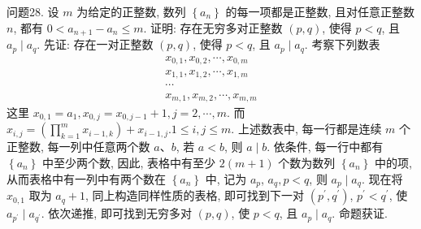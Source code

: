 问题28. 设 $m$ 为给定的正整数, 数列 $\left\{a_n\right\}$ 的每一项都是正整数, 且对任意正整数 $n$, 都有 $0<a_{n+1}-a_n \leqslant m$.
证明: 存在无穷多对正整数 $(p, q)$, 使得 $p<q$, 且 $a_p \mid a_q$.
先证: 存在一对正整数 $(p, q)$, 使得 $p<q$, 且 $a_p \mid a_q$. 考察下列数表
$$
\begin{gathered}
x_{0,1}, x_{0,2}, \cdots, x_{0, m} \\
x_{1,1}, x_{1,2}, \cdots, x_{1, m} \\
\cdots \\
x_{m, 1}, x_{m, 2}, \cdots, x_{m, m}
\end{gathered}
$$
这里 $x_{0,1}=a_1, x_{0, j}=x_{0, j-1}+1, j=2, \cdots, m$. 而 $x_{i, j}=\left(\prod_{k=1}^m x_{i-1, k}\right)+ x_{i-1, j} .1 \leqslant i, j \leqslant m$.
上述数表中, 每一行都是连续 $m$ 个正整数, 每一列中任意两个数 $a 、 b$, 若 $a<b$, 则 $a \mid b$.
依条件, 每一行中都有 $\left\{a_n\right\}$ 中至少两个数, 因此, 表格中有至少 $2(m+1)$ 个数为数列 $\left\{a_n\right\}$ 中的项, 从而表格中有一列中有两个数在 $\left\{a_n\right\}$ 中, 记为 $a_p$, $a_q, p<q$, 则 $a_p \mid a_q$.
现在将 $x_{0,1}$ 取为 $a_q+1$, 同上构造同样性质的表格, 即可找到下一对 $\left(p^{\prime}, q^{\prime}\right)$, $p^{\prime}<q^{\prime}$, 使 $a_{p^{\prime}} \mid a_{q^{\prime}}$. 依次递推, 即可找到无穷多对 $(p, q)$, 使 $p<q$, 且 $a_p \mid a_q$. 命题获证.



